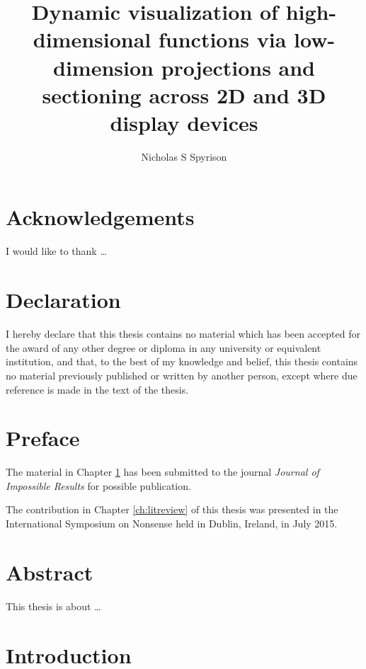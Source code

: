 \documentclass{monashthesis}
\author{Nicholas S Spyrison}
\title{Dynamic visualization of high-dimensional functions via low-dimension
projections and sectioning across 2D and 3D display devices}
\theoremstyle{definition}
\theoremstyle{definition}
\theoremstyle{definition}
\theoremstyle{remark}
\begin{document}

\titlepage

{\sf\tighttoc\doublespacing}

\chapter*{Acknowledgements}\label{acknowledgements}

I would like to thank \dots

\chapter*{Declaration}\label{declaration}

I hereby declare that this thesis contains no material which has been
accepted for the award of any other degree or diploma in any university
or equivalent institution, and that, to the best of my knowledge and
belief, this thesis contains no material previously published or written
by another person, except where due reference is made in the text of the
thesis.

\vspace*{2cm}\par\authorname

\chapter*{Preface}\label{preface}

The material in Chapter \ref{ch:intro} has been submitted to the journal
\emph{Journal of Impossible Results} for possible publication.

The contribution in Chapter \ref{ch:litreview} of this thesis was
presented in the International Symposium on Nonsense held in Dublin,
Ireland, in July 2015.

\chapter*{Abstract}\label{abstract}

This thesis is about \ldots{}

\clearpage{}\setcounter{page}{0}

\chapter{Introduction}\label{ch:intro}
\end{document}
